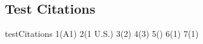 \documentclass[12pt,\documentclassflag]{lawbrief}
\begin{document}
  \subsection{Test Citations}
  \begin{LTXexample}
    \def\testCitations#1#2#3#4#5#6#7{%
      \edef\name{#1}%
      \edef\reporters{#2}%
      \edef\startpages{#3}%
      \edef\pages{#4}%
      \edef\slipsuffix{#5}%
      \edef\numberOfReporters{#6}%
      \edef\numberOfPages{#7}%
      \def\check##1##2##3##4##5##6##7{%
        \par check 1(##1) 2(##2) 3(##3) 4(##4) 5(##5) 6(##6) 7(##7)\par%
        \par testing\par%
        \assert{name}{\name}{##1}%
        \assert{reporters}{\reporters}{##2}%
        \assert{startpages}{\startpages}{##3}%
        \assert{pages}{\pages}{##4}%
        \assert{slipsuffix}{\slipsuffix}{##5}%
        \assert{numberOfReporters}{\numberOfReporters}{##6}%
        \assert{numberOfPages}{\numberOfPages}{##7}%
      }%
      testCitations 1(#1) 2(#2) 3(#3) 4(#4) 5(#5) 6(#6) 7(#7)\par%
      \bbCaseCitationEval{\name}{\pages}{\check}%
    }%

    \par
    \testCitations{A1}{1 U.S.}{2}{3}{\empty}{1}{1}\par
 
  \end{LTXexample}
\end{document}
